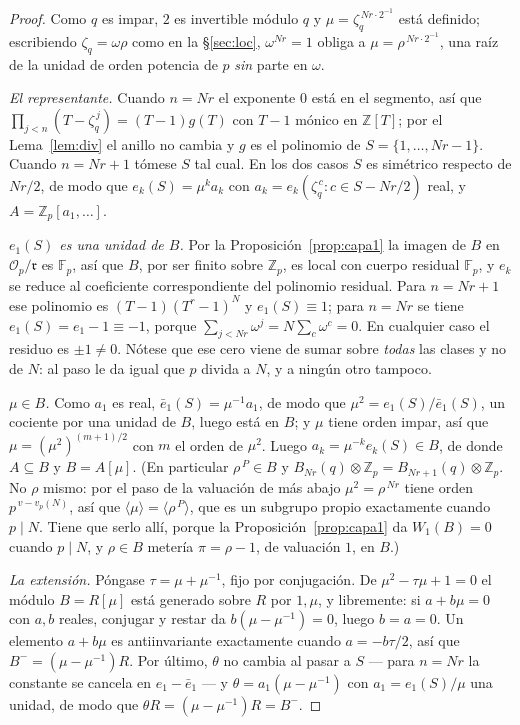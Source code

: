 \documentclass[11pt,a4paper]{article}
\theoremstyle{definition}
\newcommand{\ZZ}{\mathbb{Z}}
\newcommand{\FF}{\mathbb{F}}
\newcommand{\cO}{\mathcal{O}}
\newcommand{\rad}{\mathfrak{r}}
\begin{document}
\begin{proof}
Como $q$ es impar, $2$ es invertible m\'odulo $q$ y $\mu=\zeta_q^{\,Nr\cdot2^{-1}}$ est\'a
definido; escribiendo $\zeta_q=\omega\rho$ como en la \S\ref{sec:loc}, $\omega^{Nr}=1$ obliga a
$\mu=\rho^{\,Nr\cdot2^{-1}}$, una ra\'iz de la unidad de orden potencia de $p$ \emph{sin} parte en
$\omega$.

\emph{El representante.} Cuando $n=Nr$ el exponente $0$ est\'a en el segmento, as\'i que
$\prod_{j<n}(T-\zeta_q^{\,j})=(T-1)g(T)$ con $T-1$ m\'onico en $\ZZ[T]$; por el Lema~\ref{lem:div}
el anillo no cambia y $g$ es el polinomio de $S=\{1,\dots,Nr-1\}$. Cuando $n=Nr+1$ t\'omese $S$ tal
cual. En los dos casos $S$ es sim\'etrico respecto de $Nr/2$, de modo que $e_k(S)=\mu^k a_k$ con
$a_k=e_k(\zeta_q^{\,c}:c\in S-Nr/2)$ real, y $A=\ZZ_p[a_1,\dots]$.

\emph{$e_1(S)$ es una unidad de $B$.} Por la Proposici\'on~\ref{prop:capa1} la imagen de $B$ en
$\cO_p/\rad$ es $\FF_p$, as\'i que $B$, por ser finito sobre $\ZZ_p$, es local con cuerpo residual
$\FF_p$, y $e_k$ se reduce al coeficiente correspondiente del polinomio residual. Para
$n=Nr+1$ ese polinomio es $(T-1)(T^r-1)^N$ y $e_1(S)\equiv1$; para $n=Nr$ se tiene
$e_1(S)=e_1-1\equiv-1$, porque $\sum_{j<Nr}\omega^j=N\sum_{c}\omega^c=0$. En cualquier caso el
residuo es $\pm1\neq0$. N\'otese que ese cero viene de sumar sobre \emph{todas} las clases y no de
$N$: al paso le da igual que $p$ divida a $N$, y a ning\'un otro tampoco.

\emph{$\mu\in B$.} Como $a_1$ es real, $\bar e_1(S)=\mu^{-1}a_1$, de modo que
$\mu^2=e_1(S)/\bar e_1(S)$, un cociente por una unidad de $B$, luego est\'a en $B$; y $\mu$ tiene
orden impar, as\'i que $\mu=(\mu^2)^{(m+1)/2}$ con $m$ el orden de $\mu^2$. Luego
$a_k=\mu^{-k}e_k(S)\in B$, de donde $A\subseteq B$ y $B=A[\mu]$. (En particular $\rho^{\,P}\in B$ y
$B_{Nr}(q)\otimes\ZZ_p=B_{Nr+1}(q)\otimes\ZZ_p$. No $\rho$ mismo: por el paso de la valuaci\'on de
m\'as abajo $\mu^2=\rho^{\,Nr}$ tiene orden $p^{\,v-v_p(N)}$, as\'i que
$\langle\mu\rangle=\langle\rho^{\,P}\rangle$, que es un subgrupo propio exactamente cuando
$p\mid N$. Tiene que serlo all\'i, porque la Proposici\'on~\ref{prop:capa1} da $W_1(B)=0$ cuando
$p\mid N$, y $\rho\in B$ meter\'ia $\pi=\rho-1$, de valuaci\'on $1$, en $B$.)

\emph{La extensi\'on.} P\'ongase $\tau=\mu+\mu^{-1}$, fijo por conjugaci\'on. De
$\mu^2-\tau\mu+1=0$ el m\'odulo $B=R[\mu]$ est\'a generado sobre $R$ por $1,\mu$, y libremente: si
$a+b\mu=0$ con $a,b$ reales, conjugar y restar da $b(\mu-\mu^{-1})=0$, luego $b=a=0$. Un elemento
$a+b\mu$ es antiinvariante exactamente cuando $a=-b\tau/2$, as\'i que $B^-=(\mu-\mu^{-1})R$. Por
\'ultimo, $\theta$ no cambia al pasar a $S$ --- para $n=Nr$ la constante se cancela en
$e_1-\bar e_1$ --- y $\theta=a_1(\mu-\mu^{-1})$ con $a_1=e_1(S)/\mu$ una unidad, de modo que
$\theta R=(\mu-\mu^{-1})R=B^-$.


\end{proof}
\end{document}
